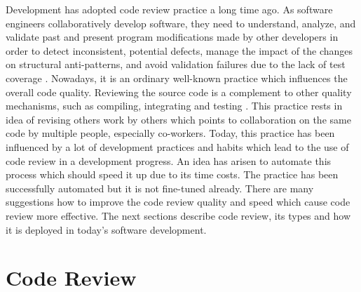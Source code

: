Development has adopted code review practice a long time ago. As software engineers collaboratively develop software, they need to understand, analyze, and validate past and present program modifications made by other developers in order to detect inconsistent, potential defects, manage the impact of the changes on structural anti-patterns, and avoid validation failures due to the lack of test coverage \cite{CodeReview_bug_and_refactor}. Nowadays, it is an ordinary well-known practice which influences the overall code quality. Reviewing the source code is a complement to other quality mechanisms, such as compiling, integrating and testing \cite{CodeReview_types}. This practice rests in idea of revising others work by others which points to collaboration on the same code by multiple people, especially co-workers. Today, this practice has been influenced by a lot of development practices and habits which lead to the use of code review in a development progress. An idea has arisen to automate this process which should speed it up due to its time costs. The practice has been successfully automated but it is not fine-tuned already. There are many suggestions how to improve the code review quality and speed which cause code review more effective. The next sections describe code review, its types and how it is deployed in today's software development.

\section{Code Review}


